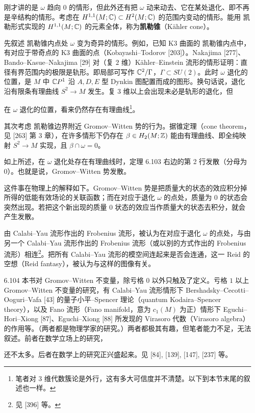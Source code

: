 刚才讲的是 $\omega$ 趋向 $0$ 的情形，但此外还有把 $\omega$ 动来动去、它在某处退化、即不再是辛结构的情形。考虑在 $H^{1,1}(M;\mathbb{C})\subset H^2(M;\mathbb{C})$ 的范围内变动的情形。能用 凯勒形式实现的 $H^{1,1}(M;\mathbb{C})$ 的元素全体，称为\textbf{凯勒锥}（Kähler cone）。

先叙述 凯勒锥内点处 $\omega$ 变为奇异的情形。例如，已知 K3 曲面的 凯勒锥内点中，有对应于带奇点的 K3 曲面的点（Kobayashi–Todorov [203]）。Nakajima [277]、Bando–Kasue–Nakajima [29] 对（复 $2$ 维）Kähler–Einstein 流形的情形证明：直径有界范围内的极限是轨形。即局部可写作 $\mathbb{C}^2/\Gamma$，$\Gamma\subset SU(2)$。此时 $\omega$ 退化的位置，是 $M$ 中 $\mathbb{C} P^1$ 沿 $A,D,E$ 型 Dynkin 图配置而成的图形。换句话说，退化沿有限条有理曲线 $S^2\to M$ 发生。复 $3$ 维以上会出现未必是轨形的退化，但

在 $\omega$ 退化的位置，看来仍然存在有理曲线\footnote{笔者对 $3$ 维代数簇论是外行，这有多大可信度并不清楚。以下到本节末尾的叙述也一样。}。

其次考虑 凯勒锥边界附近 Gromov–Witten 势的行为。据锥定理（cone theorem，见 [263] 第 3 章），在许多情形下仍存在 $\beta\in H_2(M;\mathbb{Z})$ 能由有理曲线、即全纯映射 $S^2\to M$ 实现，且 $\beta\cap\omega=0$。

如上所述，在 $\omega$ 退化处存在有理曲线时，定理 6.103 右边的第 2 行发散（分母为 $0$）。也就是说，Gromov–Witten 势发散。

这件事在物理上的解释如下。Gromov–Witten 势是把质量大的状态的效应积分掉所得的低能有效场论的关联函数；而在对应于退化 $\omega$ 的点处，质量为 $0$ 的状态会突然出现。若把这个新出现的质量 $0$ 状态的效应当作质量大的状态去积分，就会产生发散。

由 Calabi–Yau 流形作出的 Frobenius 流形，被认为在对应于退化 $\omega$ 的点处，与由另一个 Calabi–Yau 流形作出的 Frobenius 流形（或以别的方式作出的 Frobenius 流形）相连\footnote{见 [396] 等。}。把所有 Calabi–Yau 流形的模空间连起来是否会连通，这一 Reid 的空想（Reid fantasy），被认为与这样的图像有关。

\begin{remark}{6.104}
  本书对 Gromov–Witten 不变量，除亏格 $0$ 以外只触及了定义。亏格 $1$ 以上 Gromov–Witten 不变量的研究，有 Calabi–Yau 流形情形下 Bershadsky–Cecotti–Ooguri–Vafa [43] 的量子小平–Spencer 理论（quantum Kodaira–Spencer theory），以及 Fano 流形（Fano manifold，意为 $c_1(M)$ 为正）情形下 Eguchi–Hori–Xiong [87]、Eguchi–Xiong [88] 所发现的 Virasoro 代数（Virasoro algebra）的作用等。（两者都是物理学家的研究。）两者都极其有趣，但笔者能力不足，无法叙述。前者在数学立场上的研究，
\end{remark}

还不太多。后者在数学上的研究正兴盛起来。见 [84], [139], [147], [237] 等。

